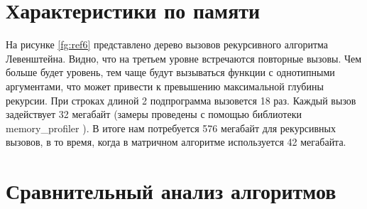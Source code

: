 \begin{figure}[ht!]
\end{figure}

\section{Характеристики по памяти}

На рисунке \ref{fg:ref6} представлено дерево вызовов рекурсивного алгоритма Левенштейна.
Видно, что на третьем уровне встречаются повторные вызовы. 
Чем больше будет уровень, тем чаще будут вызываться функции с однотипными аргументами, что может привести к превышению максимальной глубины рекурсии. 
При строках длиной 2 подпрограмма вызовется 18 раз. 
Каждый вызов задействует 32 мегабайт (замеры проведены с помощью  библиотеки memory\_profiler \cite{bib6}).
В итоге нам потребуется 576 мегабайт для рекурсивных вызовов, в то время, когда в матричном алгоритме используется 42 мегабайта. 

\begin{figure}[ht!]
\end{figure}

\section{Сравнительный анализ алгоритмов}

